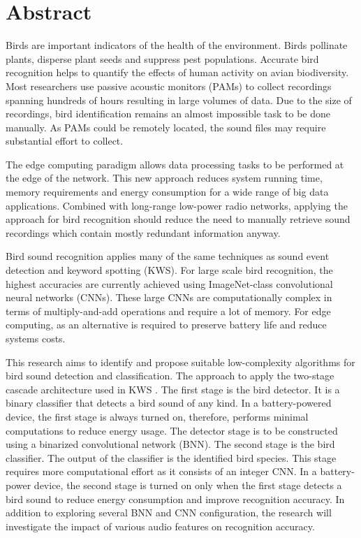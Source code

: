 \chapter*{Abstract} 


Birds are important indicators of the health of the environment. Birds pollinate plants, disperse plant seeds and suppress pest populations. Accurate bird recognition helps to quantify the effects of human activity on avian biodiversity. Most researchers use passive acoustic monitors (PAMs) to collect recordings spanning hundreds of hours resulting in large volumes of data. Due to the size of recordings, bird identification remains an almost impossible task to be done manually. As PAMs could be remotely located, the sound files may require substantial effort to collect.

The edge computing paradigm allows data processing tasks to be performed at the edge of the network. This new approach reduces system running time, memory requirements and energy consumption for a wide range of big data applications. Combined with long-range low-power radio networks, applying the approach for bird recognition should reduce the need to manually retrieve sound recordings which contain mostly redundant information anyway.

Bird sound recognition applies many of the same techniques as sound event detection and keyword spotting (KWS). For large scale bird recognition, the highest accuracies are currently achieved using ImageNet-class convolutional neural networks (CNNs). These large CNNs are computationally complex in terms of multiply-and-add operations and require a lot of memory. For edge computing, as an alternative is required to preserve battery life and reduce systems costs.

This research aims to identify and propose suitable low-complexity algorithms for bird sound detection and classification. The approach to apply the two-stage cascade architecture used in KWS \cite{Sigtia2018}. The first stage is the bird detector. It is a binary classifier that detects a bird sound of any kind. In a battery-powered device, the first stage is always turned on, therefore, performs minimal computations to reduce energy usage. The detector stage is to be constructed using a binarized convolutional network (BNN). The second stage is the bird classifier. The output of the classifier is the identified bird species. This stage requires more computational effort as it consists of an integer CNN. In a battery-power device, the second stage is turned on only when the first stage detects a bird sound to reduce energy consumption and improve recognition accuracy. In addition to exploring several BNN and CNN configuration, the research will investigate the impact of various audio features on recognition accuracy.

